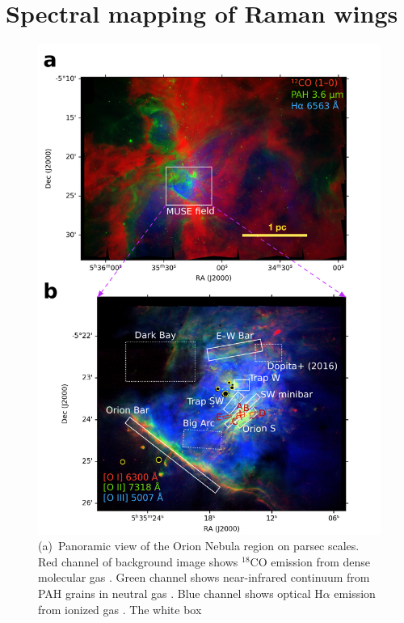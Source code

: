 \documentclass[twocolumn, times]{aastex63}
\newcommand*\chem[1]{\ensuremath{\mathrm{#1}}}
\begin{document}
\section{Spectral mapping of Raman wings}
\label{sec:muse-spectr-mapp}

\begin{figure}
  \includegraphics[width=\linewidth]{figs/raman-fov-regions}
  \caption{(a)~Panoramic view of the Orion Nebula region on parsec
    scales.  Red channel of background image shows \chem{^{18}CO}
    emission from dense molecular gas \citetext{Carma-NRO Orion
      Survey, \citealp{Kong:2018a}}. Green channel shows near-infrared
    continuum from PAH grains in neutral gas \citetext{Spitzer Orion
      Survey, \citealp{Megeath:2012a}}.  Blue channel shows optical
    H\(\alpha\) emission from ionized gas \citetext{WFI camera on ESO
      \SI{2.2}{m} La Silla, \citealp{Da-Rio:2009a}}. The white box
}
\end{figure}
\end{document}
